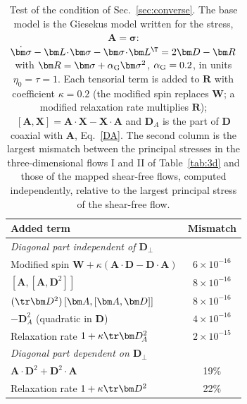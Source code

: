 \begin{table}
\caption{Test of the condition of Sec.~\ref{sec:converse}. The base model is the Giesekus model written for the stress, $\bm A=\bm\sigma$: $\dot{\bm\sigma}-\bm L\!\cdot\!\bm\sigma-\bm\sigma\!\cdot\!\bm L^\T=2\bm D-\bm R$ with $\bm R=\bm\sigma+\alpha_{\rm G}\bm\sigma^2$, $\alpha_{\rm G}=0.2$, in units $\eta_0=\tau=1$. Each tensorial term is added to $\bm R$ with coefficient $\kappa=0.2$ (the modified spin replaces $\bm W$; a modified relaxation rate multiplies $\bm R$); $[\bm A,\bm X]=\bm A\!\cdot\!\bm X-\bm X\!\cdot\!\bm A$ and $\bm D_{\!A}$ is the part of $\bm D$ coaxial with $\bm A$, Eq.~\eqref{DA}. The second column is the largest mismatch between the principal stresses in the three-dimensional flows I and II of Table~\ref{tab:3d} and those of the mapped shear-free flows, computed independently, relative to the largest principal stress of the shear-free flow.}\label{tab:converse}
\begin{ruledtabular}
\begin{tabular}{lc}
Added term & Mismatch\\
\hline
\multicolumn{2}{l}{\emph{Diagonal part independent of $\bm D_{\!\perp}$}}\\
Modified spin $\bm W+\kappa(\bm A\!\cdot\!\bm D-\bm D\!\cdot\!\bm A)$ & $6\times10^{-16}$\\
$[\bm A,[\bm A,\bm D^2]]$ & $8\times10^{-16}$\\
$(\tr\bm D^2)\,[\bm A,[\bm A,\bm D]]$ & $8\times10^{-16}$\\
$-\bm D_{\!A}^2$ (quadratic in $\bm D$) & $4\times10^{-16}$\\
Relaxation rate $1+\kappa\tr\bm D_{\!A}^2$ & $2\times10^{-15}$\\
\hline
\multicolumn{2}{l}{\emph{Diagonal part dependent on $\bm D_{\!\perp}$}}\\
$\bm A\!\cdot\!\bm D^2+\bm D^2\!\cdot\!\bm A$ & 19\%\\
Relaxation rate $1+\kappa\tr\bm D^2$ & 22\%\\
\end{tabular}
\end{ruledtabular}
\end{table}

